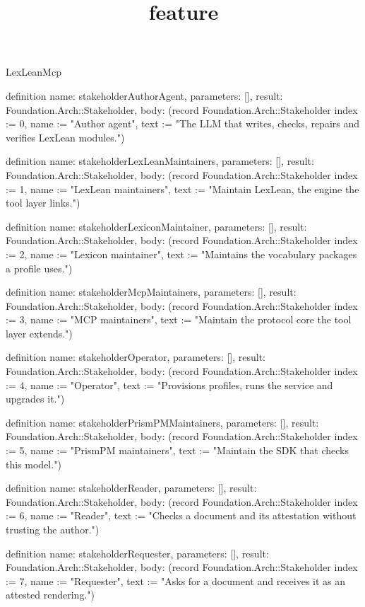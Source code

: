 \begin{lexlean}{LexLeanMcp}
\title{feature}
\begin{semanticmodule}
definition{
  name: stakeholderAuthorAgent,
  parameters: [],
  result: Foundation.Arch::Stakeholder,
  body: (record Foundation.Arch::Stakeholder {index := 0, name := "Author agent", text := "The LLM that writes, checks, repairs and verifies LexLean modules."})
}

definition{
  name: stakeholderLexLeanMaintainers,
  parameters: [],
  result: Foundation.Arch::Stakeholder,
  body: (record Foundation.Arch::Stakeholder {index := 1, name := "LexLean maintainers", text := "Maintain LexLean, the engine the tool layer links."})
}

definition{
  name: stakeholderLexiconMaintainer,
  parameters: [],
  result: Foundation.Arch::Stakeholder,
  body: (record Foundation.Arch::Stakeholder {index := 2, name := "Lexicon maintainer", text := "Maintains the vocabulary packages a profile uses."})
}

definition{
  name: stakeholderMcpMaintainers,
  parameters: [],
  result: Foundation.Arch::Stakeholder,
  body: (record Foundation.Arch::Stakeholder {index := 3, name := "MCP maintainers", text := "Maintain the protocol core the tool layer extends."})
}

definition{
  name: stakeholderOperator,
  parameters: [],
  result: Foundation.Arch::Stakeholder,
  body: (record Foundation.Arch::Stakeholder {index := 4, name := "Operator", text := "Provisions profiles, runs the service and upgrades it."})
}

definition{
  name: stakeholderPrismPMMaintainers,
  parameters: [],
  result: Foundation.Arch::Stakeholder,
  body: (record Foundation.Arch::Stakeholder {index := 5, name := "PrismPM maintainers", text := "Maintain the SDK that checks this model."})
}

definition{
  name: stakeholderReader,
  parameters: [],
  result: Foundation.Arch::Stakeholder,
  body: (record Foundation.Arch::Stakeholder {index := 6, name := "Reader", text := "Checks a document and its attestation without trusting the author."})
}

definition{
  name: stakeholderRequester,
  parameters: [],
  result: Foundation.Arch::Stakeholder,
  body: (record Foundation.Arch::Stakeholder {index := 7, name := "Requester", text := "Asks for a document and receives it as an attested rendering."})
}


\end{semanticmodule}
\end{lexlean}

